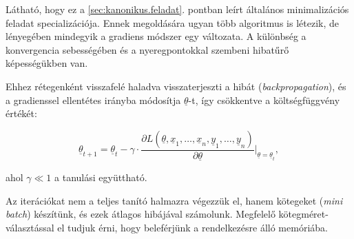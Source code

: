 

%


Látható, hogy ez a \ref{sec:kanonikus.feladat}. pontban leírt általános minimalizációs feladat specializációja.
Ennek megoldására ugyan több algoritmus is létezik, de lényegében mindegyik a gradiens módszer egy változata.
A különbség a konvergencia sebességében és a nyeregpontokkal szembeni hibatűrő képességükben van.

Ehhez rétegenként visszafelé haladva visszaterjeszti a hibát (\textit{backpropagation}),
és a gradienssel ellentétes irányba módosítja $ \underline{\theta} $-t, így csökkentve a költségfüggvény értékét:

\[ 
 \underline{\theta}_{t+1} = \underline{\theta}_t - \gamma \cdot \frac{\partial L(\underline{\theta}, \underline{x}_1, \dots, \underline{x}_n, \underline{y}_1, \dots, \underline{y}_n)}{\partial \underline{\theta}}\bigg\rvert_{\underline{\theta}=\underline{\theta}_t}, 
 \]
 

\noindent
ahol $ \gamma \ll 1 $ a tanulási együttható. 



Az iterációkat nem a teljes tanító halmazra végezzük el, 
hanem kötegeket (\textit{mini batch}) 
készítünk, és ezek átlagos hibájával számolunk. 
Megfelelő kötegméret-választással el tudjuk érni, hogy beleférjünk a rendelkezésre álló memóriába.


